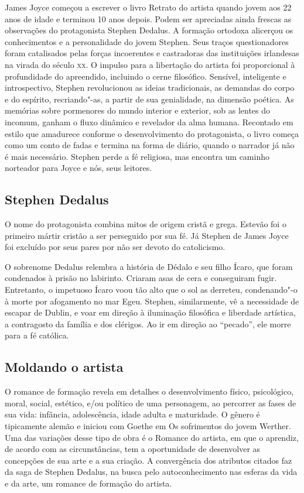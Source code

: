 James Joyce começou a escrever o livro Retrato do artista quando jovem
aos 22 anos de idade e terminou 10 anos depois. Podem ser apreciadas
ainda frescas as observações do protagonista Stephen Dedalus. A formação
ortodoxa alicerçou os conhecimentos e a personalidade do jovem Stephen.
Seus traços questionadores foram catalisados pelas forças incoerentes e
castradoras das instituições irlandesas na virada do século \textsc{xx}. O
impulso para a libertação do artista foi proporcional à profundidade do
apreendido, incluindo o cerne filosófico. Sensível, inteligente e
introspectivo, Stephen revolucionou as ideias tradicionais, as demandas
do corpo e do espírito, recriando"-as, a partir de sua genialidade, na
dimensão poética. As memórias sobre pormenores do mundo interior e
exterior, sob as lentes do incomum, ganham o fluxo dinâmico e revelador
da alma humana. Recontado em estilo que amadurece conforme o
desenvolvimento do protagonista, o livro começa como um conto de fadas e
termina na forma de diário, quando o narrador já não é mais necessário.
Stephen perde a fé religiosa, mas encontra um caminho norteador para
Joyce e nós, seus leitores.

\subsection{Stephen Dedalus}

O nome do protagonista combina mitos de origem cristã e grega. Estevão
foi o primeiro mártir cristão a ser perseguido por sua fé. Já Stephen de
James Joyce foi excluído por seus pares por não ser devoto do
catolicismo.

O sobrenome Dedalus relembra a história de Dédalo e seu filho Ícaro, que
foram condenados à prisão no labirinto. Criaram asas de cera e
conseguiram fugir. Entretanto, o impetuoso Ícaro voou tão alto que o sol
as derreteu, condenando"-o à morte por afogamento no mar Egeu. Stephen,
similarmente, vê a necessidade de escapar de Dublin, e voar em direção à
iluminação filosófica e liberdade artística, a contragosto da família e
dos clérigos. Ao ir em direção ao ``pecado'', ele morre para a fé
católica.

\subsection{Moldando o artista}

O romance de formação revela em detalhes o desenvolvimento físico,
psicológico, moral, social, estético, e/ou político de uma personagem,
ao percorrer as fases de sua vida: infância, adolescência, idade adulta
e maturidade. O gênero é tipicamente alemão e iniciou com Goethe em Os
sofrimentos do jovem Werther. Uma das variações desse tipo de obra é o
Romance do artista, em que o aprendiz, de acordo com as circunstâncias,
tem a oportunidade de desenvolver as concepções de sua arte e a sua
criação. A convergência dos atributos citados faz da saga de Stephen
Dedalus, na busca pelo autoconhecimento nas esferas da vida e da arte,
um romance de formação do artista.

